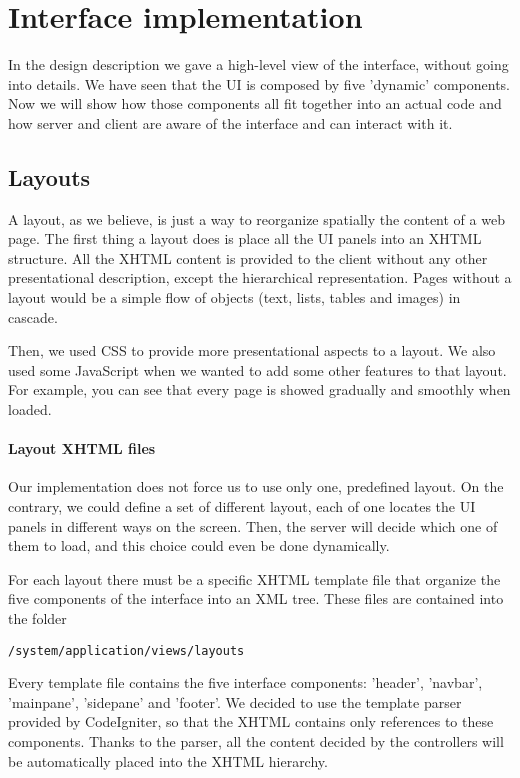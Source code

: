 \section{Interface implementation}
In the design description we gave a high-level view of the interface, without going into details. We have seen that the UI is composed by five 'dynamic' components. Now we will show how those components all fit together into an actual code and how server and client are aware of the interface and can interact with it.

\subsection{Layouts}
A layout, as we believe, is just a way to reorganize spatially the content of a web page. The first thing a layout does is place all the UI panels into an XHTML structure. All the XHTML content is provided to the client without any other presentational description, except the hierarchical representation. Pages without a layout would be a simple flow of objects (text, lists, tables and images) in cascade.

Then, we used CSS to provide more presentational aspects to a layout. We also used some JavaScript when we wanted to add some other features to that layout. For example, you can see that every page is showed gradually and smoothly when loaded.

\paragraph{Layout XHTML files}
Our implementation does not force us to use only one, predefined layout. On the contrary, we could define a set of different layout, each of one locates the UI panels in different ways on the screen. Then, the server will decide which one of them to load, and this choice could even be done dynamically.

For each layout there must be a specific XHTML template file that organize the five components of the interface into an XML tree. These files are contained into the folder
\begin{verbatim}
/system/application/views/layouts
\end{verbatim}
Every template file contains the five interface components: 'header', 'navbar', 'mainpane', 'sidepane' and 'footer'. We decided to use the template parser provided by CodeIgniter, so that the XHTML contains only references to these components. Thanks to the parser, all the content decided by the controllers will be automatically placed into the XHTML hierarchy.

